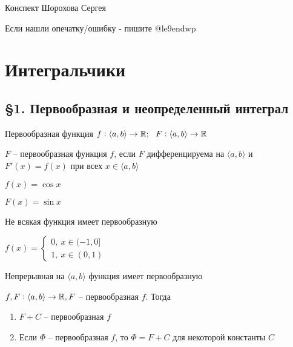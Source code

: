 \documentclass[12pt]{article}
\newcommand{\q}[1]{\langle #1 \rangle}
\begin{document}
\tableofcontents
\newpage

\begin{flushright}
    Конспект Шорохова Сергея

    Если нашли опечатку/ошибку - пишите @le9endwp
\end{flushright}

\section{Интегральчики}

\subsection{\S 1. Первообразная и неопределенный интеграл}

\begin{defin}{Первообразная функция}
    $f : \q{a, b} \rightarrow \R;\ \ F: \q{a, b} \rightarrow \R$ 

    $F$ -- первообразная функция $f$, если $F$ дифференцируема на $\q{a, b}$ и $F'(x) = f(x)$ при всех $x \in \q{a, b}$

    \begin{Example}{}
        $f(x) = \cos{x}$

        $F(x) = \sin{x}$ 
    \end{Example}
\end{defin}

\begin{propos}{}
    Не всякая функция имеет первообразную

    \begin{Example}{}
        $f(x) = \begin{cases}
            0,\ x \in (-1, 0] \\
            1,\ x \in (0, 1)
        \end{cases}$
    \end{Example}
\end{propos}

\begin{propos}{}
    Непрерывная на $\q{a, b}$ функция имеет первообразную
\end{propos}

\begin{theo}{}
    $f, F : \q{a, b} \rightarrow \R, F$ -- первообразная $f$. Тогда

    \begin{enumerate}
        \item $F + C$ -- первообразная $f$
        \item Если $\Phi$ -- первообразная $f$, то $\Phi = F + C$ для некоторой константы $C$
    \end{enumerate}
\end{theo}
\end{document}
